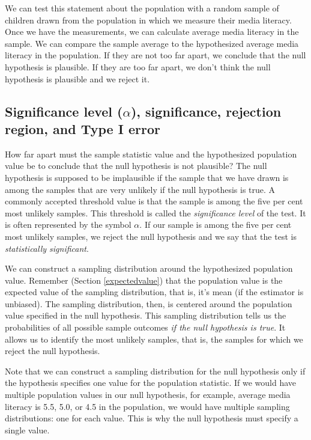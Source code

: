 \documentclass[a4paper]{book}
\theoremstyle{definition}
\theoremstyle{definition}
\theoremstyle{definition}
\theoremstyle{remark}
\begin{document}
We can test this statement about the population with a random sample of
children drawn from the population in which we measure their media
literacy. Once we have the measurements, we can calculate average media
literacy in the sample. We can compare the sample average to the
hypothesized average media literacy in the population. If they are not
too far apart, we conclude that the null hypothesis is plausible. If
they are too far apart, we don't think the null hypothesis is plausible
and we reject it.

\subsection{\texorpdfstring{Significance level (\(\alpha\)),
significance, rejection region, and Type I
error}{Significance level (\textbackslash{}alpha), significance, rejection region, and Type I error}}\label{sig-typeI}

How far apart must the sample statistic value and the hypothesized
population value be to conclude that the null hypothesis is not
plausible? The null hypothesis is supposed to be implausible if the
sample that we have drawn is among the samples that are very unlikely if
the null hypothesis is true. A commonly accepted threshold value is that
the sample is among the five per cent most unlikely samples. This
threshold is called the \emph{significance level} of the test. It is
often represented by the symbol \(\alpha\). If our sample is among the
five per cent most unlikely samples, we reject the null hypothesis and
we say that the test is \emph{statistically significant}.

We can construct a sampling distribution around the hypothesized
population value. Remember (Section \ref{expectedvalue}) that the
population value is the expected value of the sampling distribution,
that is, it's mean (if the estimator is unbiased). The sampling
distribution, then, is centered around the population value specified in
the null hypothesis. This sampling distribution tells us the
probabilities of all possible sample outcomes \emph{if the null
hypothesis is true}. It allows us to identify the most unlikely samples,
that is, the samples for which we reject the null hypothesis.

Note that we can construct a sampling distribution for the null
hypothesis only if the hypothesis specifies one value for the population
statistic. If we would have multiple population values in our null
hypothesis, for example, average media literacy is 5.5, 5.0, or 4.5 in
the population, we would have multiple sampling distributions: one for
each value. This is why the null hypothesis must specify a single value.
\end{document}
